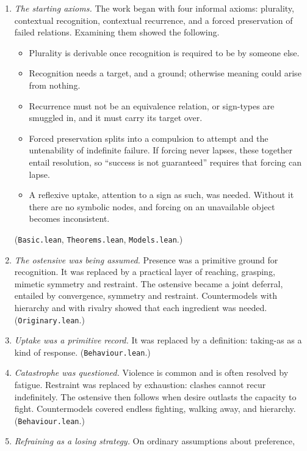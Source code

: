 \documentclass[11pt]{article}
\begin{document}
\begin{enumerate}
  \item \emph{The starting axioms.} The work began with four informal axioms: plurality,
    contextual recognition, contextual recurrence, and a forced preservation of failed
    relations. Examining them showed the following.
    \begin{itemize}[nosep]
      \item Plurality is derivable once recognition is required to be by someone else.
      \item Recognition needs a target, and a ground; otherwise meaning could arise from
        nothing.
      \item Recurrence must not be an equivalence relation, or sign-types are smuggled in,
        and it must carry its target over.
      \item Forced preservation splits into a compulsion to attempt and the untenability of
        indefinite failure. If forcing never lapses, these together entail resolution, so
        ``success is not guaranteed'' requires that forcing can lapse.
      \item A reflexive uptake, attention to a sign as such, was needed. Without it there
        are no symbolic nodes, and forcing on an unavailable object becomes inconsistent.
    \end{itemize}
    (\texttt{Basic.lean}, \texttt{Theorems.lean}, \texttt{Models.lean}.)
  \item \emph{The ostensive was being assumed.} Presence was a primitive ground for
    recognition. It was replaced by a practical layer of reaching, grasping, mimetic
    symmetry and restraint. The ostensive became a joint deferral, entailed by convergence,
    symmetry and restraint. Countermodels with hierarchy and with rivalry showed that each
    ingredient was needed. (\texttt{Originary.lean}.)
  \item \emph{Uptake was a primitive record.} It was replaced by a definition: taking-as as
    a kind of response. (\texttt{Behaviour.lean}.)
  \item \emph{Catastrophe was questioned.} Violence is common and is often resolved by
    fatigue. Restraint was replaced by exhaustion: clashes cannot recur indefinitely. The
    ostensive then follows when desire outlasts the capacity to fight. Countermodels covered
    endless fighting, walking away, and hierarchy. (\texttt{Behaviour.lean}.)
  \item \emph{Refraining as a losing strategy.} On ordinary assumptions about preference,

\end{enumerate}
\end{document}
